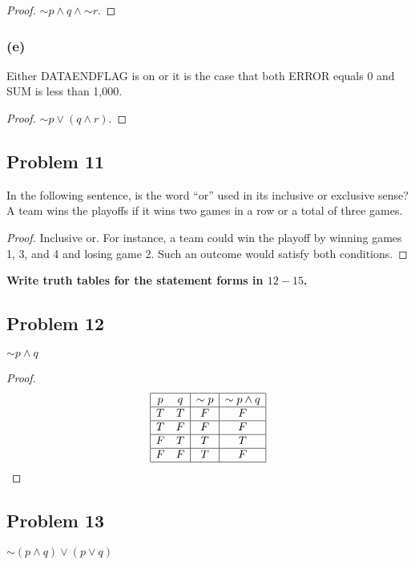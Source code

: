 \documentclass[14pt]{extarticle}
\begin{document}
\begin{proof}
${\sim p} \wedge q \wedge {\sim r}$.
\end{proof}

\subsubsection{(e)}
Either DATAENDFLAG is on or it is the case that both ERROR equals 0 and SUM is
less than 1,000.

\begin{proof}
${\sim p} \vee (q \wedge r)$.
\end{proof}

\subsection{Problem 11}
In the following sentence, is the word ``or'' used in its inclusive or exclusive
sense? A team wins the playoffs if it wins two games in a row or a total of
three games.

\begin{proof}
Inclusive or. For instance, a team could win the playoff by winning games 1, 3,
and 4 and losing game 2. Such an outcome would satisfy both conditions.
\end{proof}

{\bf Write truth tables for the statement forms in $12-15$.}

\subsection{Problem 12}
${\sim p} \wedge q$

\begin{proof}
$$
\begin{array}{|cc|c|c|}
\hline
p & q & {\sim p} & {\sim p} \wedge q \\
\hline
T & T & F & F \\
\hline
T & F & F & F \\
\hline
F & T & T & T \\
\hline
F & F & T & F \\
\hline
\end{array}
$$
\end{proof}

\subsection{Problem 13}
${\sim(p \wedge q)} \vee (p \vee q)$
\end{document}
